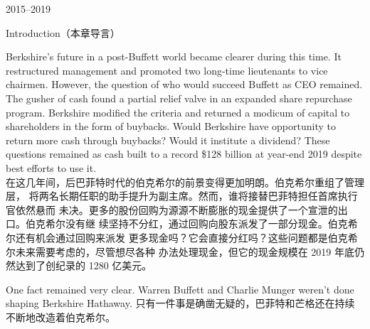 \begin{chapter}{2015--2019}
\begin{section}{Introduction（本章导言）}
\begin{verseparallel}
  {
    Berkshire's future in a post-Buffett world became clearer during this time.
    It restructured management and promoted two long-time lieutenants to vice
    chairmen. However, the question of who would succeed Buffett as CEO
    remained. The gusher of cash found a partial relief valve in an expanded
    share repurchase program. Berkshire modified the criteria and returned a
    modicum of capital to shareholders in the form of buybacks. Would Berkshire
    have opportunity to return more cash through buybacks? Would it institute a
    dividend? These questions remained as cash built to a record \$128 billion at
    year-end 2019 despite best efforts to use it. \\
  }
  {
    在这几年间，后巴菲特时代的伯克希尔的前景变得更加明朗。伯克希尔重组了管理层，
    将两名长期任职的助手提升为副主席。然而，谁将接替巴菲特担任首席执行官依然悬而
    未决。更多的股份回购为源源不断膨胀的现金提供了一个宣泄的出口。伯克希尔没有继
    续坚持不分红，通过回购向股东派发了一部分现金。伯克希尔还有机会通过回购来派发
    更多现金吗？它会直接分红吗？这些问题都是伯克希尔未来需要考虑的，尽管想尽各种
    办法处理现金，但它的现金规模在 2019 年底仍然达到了创纪录的 1280 亿美元。
  }
\end{verseparallel}

\begin{verseparallel}
  {
    One fact remained very clear. Warren Buffett and Charlie Munger weren't
    done shaping Berkshire Hathaway.
  }
  {
    只有一件事是确凿无疑的，巴菲特和芒格还在持续不断地改造着伯克希尔。
  }
\end{verseparallel}


\end{section}
\end{chapter}

